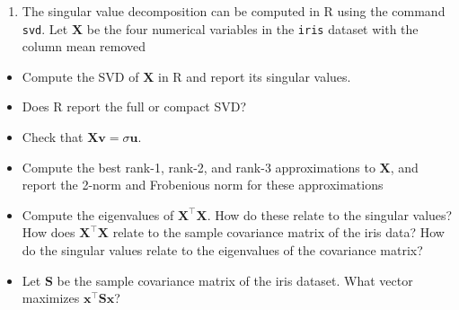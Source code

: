 \documentclass[]{book}
\newenvironment{Shaded}{\begin{snugshade}}{\end{snugshade}}
\newcommand{\CommentTok}[1]{\textcolor[rgb]{0.56,0.35,0.01}{\textit{#1}}}
\newcommand{\DecValTok}[1]{\textcolor[rgb]{0.00,0.00,0.81}{#1}}
\newcommand{\KeywordTok}[1]{\textcolor[rgb]{0.13,0.29,0.53}{\textbf{#1}}}
\newcommand{\NormalTok}[1]{#1}
\newcommand{\OperatorTok}[1]{\textcolor[rgb]{0.81,0.36,0.00}{\textbf{#1}}}
\newcommand{\StringTok}[1]{\textcolor[rgb]{0.31,0.60,0.02}{#1}}
\providecommand{\tightlist}{%
  \setlength{\itemsep}{0pt}\setlength{\parskip}{0pt}}
\theoremstyle{definition}
\theoremstyle{definition}
\theoremstyle{definition}
\theoremstyle{remark}
\begin{document}
\begin{enumerate}
\def\labelenumi{\arabic{enumi}.}
\setcounter{enumi}{1}
\tightlist
\item
  The singular value decomposition can be computed in R using the command \texttt{svd}. Let \(\boldsymbol X\) be the four numerical variables in the \texttt{iris} dataset with the column mean removed
\end{enumerate}

\begin{Shaded}
\end{Shaded}

\begin{itemize}
\item
  Compute the SVD of \(\boldsymbol X\) in R and report its singular values.
\item
  Does R report the full or compact SVD?
\item
  Check that \(\boldsymbol X\boldsymbol v= \sigma \boldsymbol u\).
\item
  Compute the best rank-1, rank-2, and rank-3 approximations to \(\boldsymbol X\), and report the 2-norm and Frobenious norm for these approximations
\item
  Compute the eigenvalues of \(\boldsymbol X^\top \boldsymbol X\). How do these relate to the singular values? How does \(\boldsymbol X^\top \boldsymbol X\) relate to the sample covariance matrix of the iris data? How do the singular values relate to the eigenvalues of the covariance matrix?
\item
  Let \(\boldsymbol S\) be the sample covariance matrix of the iris dataset. What vector maximizes \(\boldsymbol x^\top \boldsymbol S\boldsymbol x\)?
\end{itemize}
\end{document}
